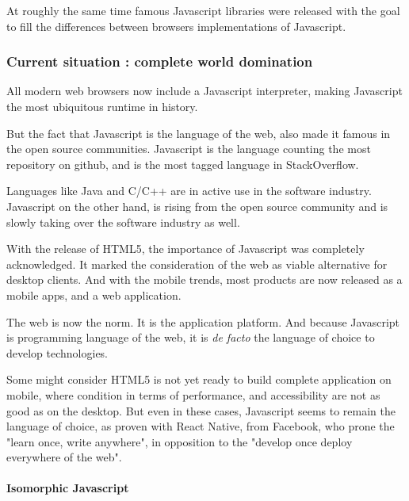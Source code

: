 At roughly the same time famous Javascript libraries were released with the goal to fill the differences between browsers implementations of Javascript.


\subsubsection{Current situation : complete world domination}

All modern web browsers now include a Javascript interpreter, making Javascript the most ubiquitous runtime in history. \cite{Flanagan2006}

But the fact that Javascript is the language of the web, also made it famous in the open source communities.
Javascript is the language counting the most repository on github, and is the most tagged language in StackOverflow.

Languages like Java and C/C++ are in active use in the software industry.
Javascript on the other hand, is rising from the open source community and is slowly taking over the software industry as well.

With the release of HTML5, the importance of Javascript was completely acknowledged.
It marked the consideration of the web as viable alternative for desktop clients.
And with the mobile trends, most products are now released as a mobile apps, and a web application.

The web is now the norm.
It is the application platform.
And because Javascript is programming language of the web, it is \textit{de facto} the language of choice to develop technologies.

Some might consider HTML5 is not yet ready to build complete application on mobile, where condition in terms of performance, and accessibility are not as good as on the desktop.
But even in these cases, Javascript seems to remain the language of choice, as proven with React Native, from Facebook, who prone the "learn once, write anywhere", in opposition to the "develop once deploy everywhere of the web".


\paragraph{Isomorphic Javascript}

